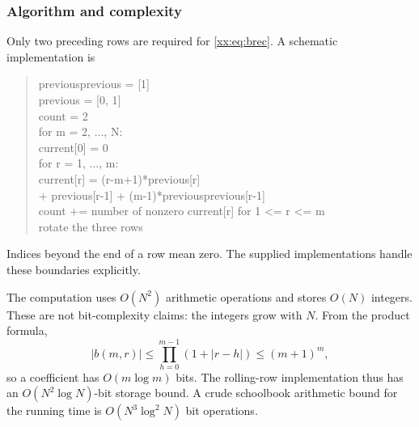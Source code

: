 \documentclass[11pt,a4paper]{article}
\numberwithin{equation}{section}
\theoremstyle{definition}
\theoremstyle{remark}
\theoremstyle{plain}
\begin{document}
\subsubsection{Algorithm and complexity}
Only two preceding rows are required for \eqref{xx:eq:brec}. A schematic
implementation is
\begin{quote}\ttfamily\small
previousprevious = [1]\\
previous = [0, 1]\\
count = 2\\
for m = 2, ..., N:\\
\hspace*{1em}current[0] = 0\\
\hspace*{1em}for r = 1, ..., m:\\
\hspace*{2em}current[r] = (r-m+1)*previous[r]\\
\hspace*{3em}+ previous[r-1] + (m-1)*previousprevious[r-1]\\
\hspace*{1em}count += number of nonzero current[r] for 1 <= r <= m\\
\hspace*{1em}rotate the three rows
\end{quote}
Indices beyond the end of a row mean zero. The supplied implementations
handle these boundaries explicitly.

The computation uses $O(N^2)$ arithmetic operations and stores $O(N)$
integers. These are not bit-complexity claims: the integers grow with $N$.
From the product formula,
\[
 |b(m,r)|\le\prod_{h=0}^{m-1}(1+|r-h|)\le(m+1)^m,
\]
so a coefficient has $O(m\log m)$ bits. The rolling-row implementation thus
has an $O(N^2\log N)$-bit storage bound. A crude schoolbook arithmetic bound
for the running time is $O(N^3\log^2 N)$ bit operations.
\end{document}
